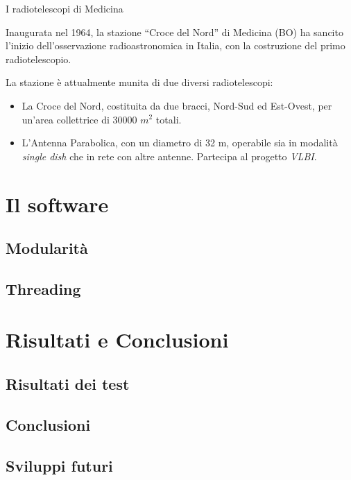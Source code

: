 \documentclass[red]{beamer}
\begin{document}
\begin{frame}{I radiotelescopi di Medicina}
	\begin{figure}
		\label{fig:rtscopes}
	\end{figure}
			Inaugurata nel 1964, la stazione ``Croce del Nord'' di Medicina (BO)
			ha sancito l'inizio dell'osservazione radioastronomica in Italia,
			con la costruzione del primo radiotelescopio.

			La stazione è attualmente munita di due diversi radiotelescopi:
			\pause
			\begin{itemize}[<+->]
				\item La \alert{Croce del Nord}, costituita da due bracci,
					Nord-Sud ed Est-Ovest, per un'area collettrice di 30000
					$m^2$ totali.
				\item L'\alert{Antenna Parabolica}, con un diametro di 32 m,
					operabile sia in modalità \emph{single dish} che in rete con
					altre antenne. Partecipa al progetto \emph{VLBI}.
			\end{itemize}

\end{frame}

\section{Il software}
\subsection{Modularità}
\subsection{Threading}
\section{Risultati e Conclusioni}
\subsection{Risultati dei test}
\subsection{Conclusioni}
\subsection{Sviluppi futuri}
\end{document}
